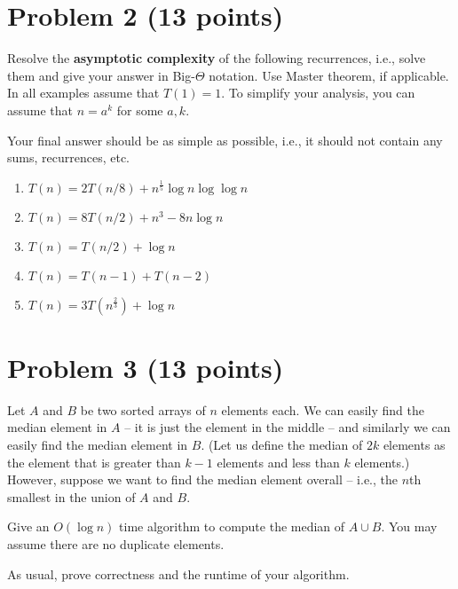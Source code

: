 \documentclass[letterpaper, 11pt]{article}
\begin{document}



\section{Problem 2 (13 points)}
Resolve the \textbf{asymptotic complexity} of the following recurrences, i.e., solve them and give your answer in Big-$\Theta$ notation. Use Master theorem, if applicable.
In all examples assume that $T(1) = 1.$
To simplify your analysis, you can assume that $n = a^k$ for some $a, k$.

Your final answer should be as simple as possible, i.e., it should not contain any sums, recurrences, etc. 

\begin{enumerate}
\item $T(n) = 2T(n/8) + n^{\frac{1}{5}}\log n \log \log n $

\item $T(n) = 8T(n/2) + n^3 - 8n\log n$


\item $T(n) = T(n/2) + \log n$


\item $T(n) = T(n-1) + T(n-2)$




\item $T(n) = 3T(n^{\frac{2}{3}}) + \log n$


\end{enumerate}




\section{Problem 3 (13 points)}  Let $A$ and $B$ be two sorted arrays of $n$ elements each. We can easily find the median element in $A$ -- it is just the element in the middle -- and similarly we can easily find the median element in $B$. (Let us define the median of $2k$ elements as the element that is greater than $k-1$ elements and less than $k$ elements.) However, suppose we want to find the median element overall -- i.e., the $n$th smallest in the union of $A$ and $B$. 

Give an $O(\log n)$ time algorithm to compute the median of $A \cup B$. You may assume there are no duplicate elements.

As usual, prove correctness and the runtime of your algorithm. 


\end{document}
